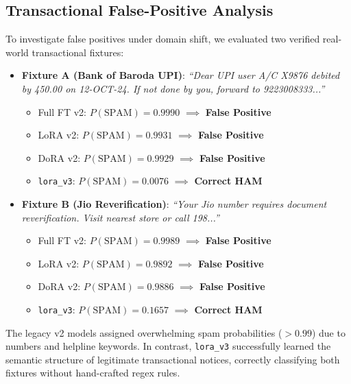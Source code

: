 \documentclass[conference]{IEEEtran}
\begin{document}
\subsection{Transactional False-Positive Analysis}
To investigate false positives under domain shift, we evaluated two verified real-world transactional fixtures:
\begin{itemize}
    \item \textbf{Fixture A (Bank of Baroda UPI)}: \textit{``Dear UPI user A/C X9876 debited by 450.00 on 12-OCT-24. If not done by you, forward to 9223008333...''}
    \begin{itemize}
        \item Full FT v2: $P(\text{SPAM}) = 0.9990$ $\implies$ \textbf{False Positive}
        \item LoRA v2: $P(\text{SPAM}) = 0.9931$ $\implies$ \textbf{False Positive}
        \item DoRA v2: $P(\text{SPAM}) = 0.9929$ $\implies$ \textbf{False Positive}
        \item \texttt{lora\_v3}: $P(\text{SPAM}) = \mathbf{0.0076}$ $\implies$ \textbf{Correct HAM}
    \end{itemize}
    \item \textbf{Fixture B (Jio Reverification)}: \textit{``Your Jio number requires document reverification. Visit nearest store or call 198...''}
    \begin{itemize}
        \item Full FT v2: $P(\text{SPAM}) = 0.9989$ $\implies$ \textbf{False Positive}
        \item LoRA v2: $P(\text{SPAM}) = 0.9892$ $\implies$ \textbf{False Positive}
        \item DoRA v2: $P(\text{SPAM}) = 0.9886$ $\implies$ \textbf{False Positive}
        \item \texttt{lora\_v3}: $P(\text{SPAM}) = \mathbf{0.1657}$ $\implies$ \textbf{Correct HAM}
    \end{itemize}
\end{itemize}
The legacy v2 models assigned overwhelming spam probabilities ($>0.99$) due to numbers and helpline keywords. In contrast, \texttt{lora\_v3} successfully learned the semantic structure of legitimate transactional notices, correctly classifying both fixtures without hand-crafted regex rules.
\end{document}
